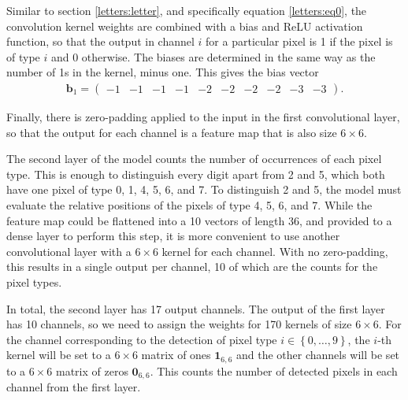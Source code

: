 \documentclass{somasmsc}
\begin{document}
Similar to section \ref{letters:letter}, and specifically equation \ref{letters:eq0}, the convolution kernel weights are combined with a bias and ReLU activation function, so that the output in channel $i$ for a particular pixel is 1 if the pixel is of type $i$ and 0 otherwise. The biases are determined in the same way as the number of 1s in the kernel, minus one. This gives the bias vector
\begin{align*}
    \pmb{b}_1 =
    \begin{pmatrix}
        -1 & -1 & -1 & -1 & -2 & -2 & -2 & -2 & -3 & -3
    \end{pmatrix}.
\end{align*}

Finally, there is zero-padding applied to the input in the first convolutional layer, so that the output for each channel is a feature map that is also size $6 \times 6$.

The second layer of the model counts the number of occurrences of each pixel type. This is enough to distinguish every digit apart from 2 and 5, which both have one pixel of type 0, 1, 4, 5, 6, and 7. To distinguish 2 and 5, the model must evaluate the relative positions of the pixels of type 4, 5, 6, and 7. While the feature map could be flattened into a 10 vectors of length 36, and provided to a dense layer to perform this step, it is more convenient to use another convolutional layer with a $6 \times 6$ kernel for each channel. With no zero-padding, this results in a single output per channel, 10 of which are the counts for the pixel types.

In total, the second layer has 17 output channels. The output of the first layer has 10 channels, so we need to assign the weights for 170 kernels of size $6 \times 6$. For the channel corresponding to the detection of pixel type $i \in \left\{0, \dots, 9\right\}$, the $i$-th kernel will be set to a $6 \times 6$ matrix of ones $\mathbf{1}_{6,6}$ and the other channels will be set to a $6 \times 6$ matrix of zeros $\mathbf{0}_{6,6}$. This counts the number of detected pixels in each channel from the first layer.
\end{document}
